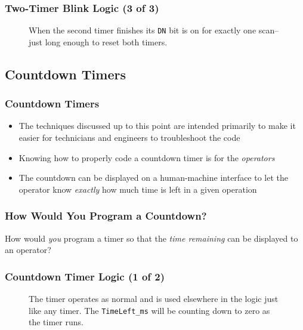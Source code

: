 \begin{frame}
    \frametitle{Two-Timer Blink Logic (3 of 3)}

    \begin{figure}
        \centering
        \resizebox{0.5\linewidth}{!}{
            
        }
        
        \vspace{0.5em}
        {\footnotesize When the second timer finishes its \texttt{DN} bit is on for exactly one scan--just long enough to reset both timers.\par}
    \end{figure}
\end{frame}

\subsection{Countdown Timers}

\begin{frame}
    \frametitle{Countdown Timers}

    \begin{itemize}
        \item The techniques discussed up to this point are intended primarily to make it easier for technicians and engineers to troubleshoot the code
        \item Knowing how to properly code a countdown timer is for the \emph{operators}
        \item The countdown can be displayed on a human-machine interface to let the operator know \emph{exactly} how much time is left in a given operation
    \end{itemize}
\end{frame}

\begin{frame}
    \frametitle{How Would You Program a Countdown?}

    \centering
    \Large{How would \emph{you} program a timer so that the \emph{time remaining} can be displayed to an operator?}
\end{frame}

\begin{frame}
    \frametitle{Countdown Timer Logic (1 of 2)}

    \begin{figure}
        \centering
        \resizebox{0.875\linewidth}{!}{
            
        }

        \vspace{0.5em}
        {\footnotesize The timer operates as normal and is used elsewhere in the logic just like any timer. The \texttt{TimeLeft\_ms} will be counting down to zero as the timer runs.\par}
    \end{figure}
\end{frame}


